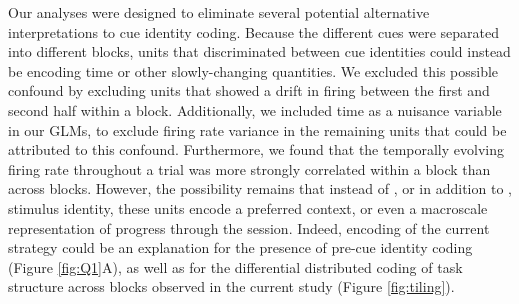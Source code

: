 \documentclass[11pt]{article}
\let\cite=\citep
\providecommand{\DIFadd}[1]{{\protect\color{red} \sf #1}} %
\providecommand{\DIFdel}[1]{} %
\providecommand{\DIFaddbegin}{} %
\providecommand{\DIFaddend}{} %
\providecommand{\DIFdelbegin}{} %
\providecommand{\DIFdelend}{} %
\newcommand{\DIFscaledelfig}{0.5}
\newlength{\DIFdelgraphicswidth} %
\newlength{\DIFdelgraphicsheight} %
\newcommand{\DIFaddincludegraphics}[2][]{{\color{red}\fbox{\DIFOincludegraphics[#1]{#2}}}} %
\newcommand{\DIFdelincludegraphics}[2][]{%
\sbox{\DIFdelgraphicsbox}{\DIFOincludegraphics[#1]{#2}}%
\settoboxwidth{\DIFdelgraphicswidth}{\DIFdelgraphicsbox} %
\settoboxtotalheight{\DIFdelgraphicsheight}{\DIFdelgraphicsbox} %
\scalebox{\DIFscaledelfig}{%
\parbox[b]{\DIFdelgraphicswidth}{\usebox{\DIFdelgraphicsbox}\\[-\baselineskip] \rule{\DIFdelgraphicswidth}{0em}}\llap{\resizebox{\DIFdelgraphicswidth}{\DIFdelgraphicsheight}{%
\setlength{\unitlength}{\DIFdelgraphicswidth}%
\begin{picture}(1,1)%
\thicklines\linethickness{2pt} %
{\color[rgb]{1,0,0}\put(0,0){\framebox(1,1){}}}%
{\color[rgb]{1,0,0}\put(0,0){\line( 1,1){1}}}%
{\color[rgb]{1,0,0}\put(0,1){\line(1,-1){1}}}%
\end{picture}%
}\hspace*{3pt}}} %
} %
\DeclareRobustCommand{\DIFaddbegin}{\DIFOaddbegin \let\includegraphics\DIFaddincludegraphics} %
\DeclareRobustCommand{\DIFaddend}{\DIFOaddend \let\includegraphics\DIFOincludegraphics} %
\DeclareRobustCommand{\DIFdelbegin}{\DIFOdelbegin \let\includegraphics\DIFdelincludegraphics} %
\DeclareRobustCommand{\DIFdelend}{\DIFOaddend \let\includegraphics\DIFOincludegraphics} %
\begin{document}
Our analyses were designed to eliminate several potential alternative
interpretations to cue identity coding. Because the different cues
were separated into different blocks, units that discriminated between
cue identities could instead be encoding time or other slowly-changing
quantities. We excluded this possible confound by excluding units that
showed a drift in firing between the first and second half within a
block. \DIFaddbegin \DIFadd{Additionally, we included time as a nuisance variable in our
GLMs, to exclude firing rate variance in the remaining units that
could be attributed to this confound. Furthermore, we found that the
temporally evolving firing rate throughout a trial was more strongly
correlated within a block than across blocks. }\DIFaddend However, the \DIFdelbegin \DIFdel{possiblity }\DIFdelend \DIFaddbegin \DIFadd{possibility
}\DIFaddend remains that instead of\DIFaddbegin \DIFadd{, }\DIFaddend or in addition to\DIFaddbegin \DIFadd{, }\DIFaddend stimulus identity, these
units encode a preferred context, or even a macroscale representation
of progress through the session. Indeed, encoding of the current
strategy could be an explanation for the \DIFdelbegin \DIFdel{sustained difference in population averaged firing across stimulus
blocks (Figure \ref{fig:pop}}\DIFdelend \DIFaddbegin \DIFadd{presence of pre-cue identity
coding (Figure \ref{fig:Q1}A}\DIFaddend ), as well as \DIFdelbegin \DIFdel{a potential explanation for the differentially tiling }\DIFdelend \DIFaddbegin \DIFadd{for the differential
distributed coding }\DIFaddend of task structure across blocks \DIFaddbegin \DIFadd{observed }\DIFaddend in the
current study (Figure \ref{fig:tiling}).

\DIFdelbegin \DIFdel{A different potential confound is that between outcome and action
value coding. We discriminated between these possiblities by analzying
error trials, where the rat appraoched reward (left turn) after
presentation of the reward-unavailable cue. Units that were modulated
by the expected outcome of the cue maintained their specific firing
patterns even during error trials, as expected from outcome value
coding but not action value coding. Additionally, NAc signals have
been shown to be modulated by response vigor \cite{McGinty2013}; to
detangle this from our results we included trial length (i.e.\ latency
to arrival at the reward site) as a predictor in our GLMs, and found
units with cue feature correlates independent of trial length.
}%
\end{document}

